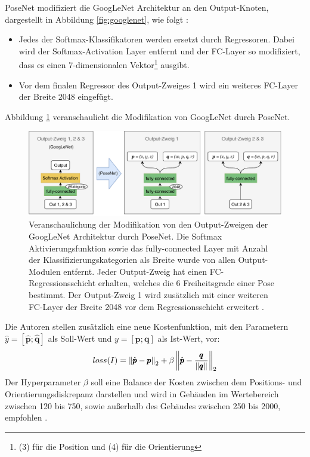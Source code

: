 PoseNet modifiziert die GoogLeNet Architektur an den Output-Knoten, dargestellt in Abbildung \ref{fig:googlenet}, wie folgt \cite{kendallPoseNetConvolutionalNetwork2015}:
\begin{itemize}
	\item Jedes der Softmax-Klassifikatoren werden ersetzt durch Regressoren. Dabei wird der Softmax-Activation Layer entfernt und der FC-Layer so modifiziert, dass es einen 7-dimensionalen Vektor\footnote{(3) für die Position und (4) für die Orientierung} ausgibt.
	\item Vor dem finalen Regressor des Output-Zweiges 1 wird ein weiteres FC-Layer der Breite 2048 eingefügt.

\end{itemize}
Abbildung \ref{fig:posenet_mods} veranschaulicht die Modifikation von GoogLeNet durch PoseNet.
\vspace*{1cm}
 \begin{figure}[H]
	\centering
	\includegraphics[width=\textwidth]{images/googlenet/posenet_diagram2.pdf}
	\caption{Veranschaulichung der Modifikation von den Output-Zweigen der GoogLeNet Architektur durch PoseNet. Die Softmax Aktivierungsfunktion sowie das fully-connected Layer mit Anzahl der Klassifizierungskategorien als Breite wurde von allen Output-Modulen entfernt. Jeder Output-Zweig hat einen FC-Regressionsschicht erhalten, welches die 6 Freiheitsgrade einer Pose bestimmt. Der Output-Zweig 1 wird zusätzlich mit einer weiteren FC-Layer der Breite 2048 vor dem Regressionsschicht erweitert \cite{kendallPoseNetConvolutionalNetwork2015}.}
	\label{fig:posenet_mods}
\end{figure}
\vspace*{2cm}

Die Autoren \citet{kendallPoseNetConvolutionalNetwork2015} stellen zusätzlich eine neue Kostenfunktion, mit den Parametern $\hat{y} = [\hat{\pmb{p}};\hat{\pmb{q}}]$ als Soll-Wert und $y = [\pmb{p};\pmb{q}]$ als Ist-Wert, vor:
\begin{equation}
	\label{eq:posenet_loss}
	loss(I) = \left\lVert \hat{\pmb{p}} - \pmb{p} \right\rVert_2 + \beta \left\lVert \hat{\pmb{p}} - \frac{\pmb{q}}{\left\lVert\pmb{q}\right\rVert}\right\rVert_2
\end{equation}
Der Hyperparameter $\beta$ soll eine Balance der Kosten zwischen dem Positions- und Orientierungsdiskrepanz darstellen und wird in Gebäuden im Wertebereich zwischen 120 bis 750, sowie außerhalb des Gebäudes zwischen 250 bis 2000, empfohlen  \citet{kendallPoseNetConvolutionalNetwork2015}. 